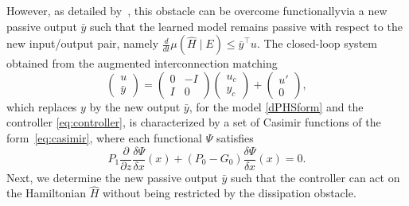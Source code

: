 \documentclass[letterpaper, 10 pt, conference]{ieeeconf}  %
\newcounter{part} %
\begin{document}
However, as detailed by~\cite{macchelli2015control}, this obstacle can be overcome functionallyvia a new passive output $\bar{y}$ such that the learned model remains passive with respect to the new input/output pair, namely $\frac{d}{dt}\mu(\hat{H}\mid E)\le \bar{y}^\top u$. The closed-loop system obtained from the augmented interconnection matching 
\begin{equation}
\begin{pmatrix}
u \\
\bar{y}
\end{pmatrix}
=
\begin{pmatrix}
0 & -I \\
I & 0
\end{pmatrix}
\begin{pmatrix}
u_c \\
y_c
\end{pmatrix}
+
\begin{pmatrix}
u' \\
0
\end{pmatrix},
\label{eq:new_interconnection}
\end{equation}
which replaces $y$ by the new output $\bar{y}$, for the model \eqref{dPHSform} and the controller \eqref{eq:controller}, is characterized by a set of Casimir functions of the form~\cref{eq:casimir}, where each functional $\Psi$ satisfies
\begin{equation}
P_1 \frac{\partial}{\partial z} \frac{\delta \Psi}{\delta x}(x)
+ (P_0 - G_0)\frac{\delta \Psi}{\delta x}(x) = 0.
\label{eq:new_casimir_pde}
\end{equation}
Next, we determine the new passive output $\bar{y}$ such that the controller can act on the Hamiltonian $\hat{H}$ without being restricted by the dissipation obstacle.
\end{document}
